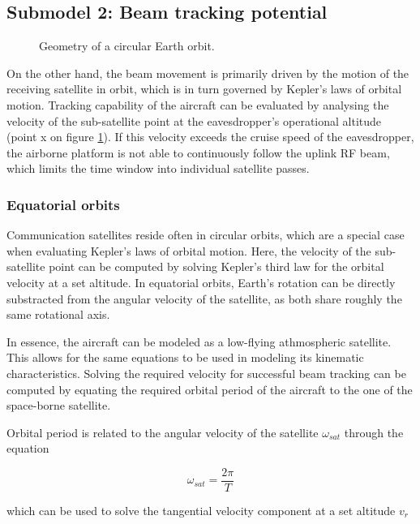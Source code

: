 \documentclass[english, 12pt, a4paper, elec, utf8, a-1b, online]{aaltothesis}
\begin{document}
\subsection{Submodel 2: Beam tracking potential}

\begin{figure}[h]
  \centering
  
  \caption{Geometry of a circular Earth orbit.}
  \label{fig-orbit-geometry}
\end{figure}

On the other hand, the beam movement is primarily driven by the motion of the receiving satellite in orbit, which is in turn governed by Kepler's laws of orbital motion.
Tracking capability of the aircraft can be evaluated by analysing the velocity of the sub-satellite point at the eavesdropper's operational altitude (point x on figure \ref{fig-orbit-geometry}).
If this velocity exceeds the cruise speed of the eavesdropper, the airborne platform is not able to continuously follow the uplink RF beam, which limits the time window into individual satellite passes.

\subsubsection{Equatorial orbits}

Communication satellites reside often in circular orbits, which are a special case when evaluating Kepler's laws of orbital motion.
Here, the velocity of the sub-satellite point can be computed by solving Kepler's third law for the orbital velocity at a set altitude.
In equatorial orbits, Earth's rotation can be directly substracted from the angular velocity of the satellite, as both share roughly the same rotational axis.

In essence, the aircraft can be modeled as a low-flying athmospheric satellite.
This allows for the same equations to be used in modeling its kinematic characteristics.
Solving the required velocity for successful beam tracking can be computed by equating the required orbital period of the aircraft to the one of the space-borne satellite.

Orbital period is related to the angular velocity of the satellite $\omega_{sat}$ through the equation

\begin{equation} \label{eq-ang-vel-1}
  \omega_{sat} = \frac{2\pi}{T}
\end{equation}

\noindent
which can be used to solve the tangential velocity component at a set altitude $v_r$
\end{document}
